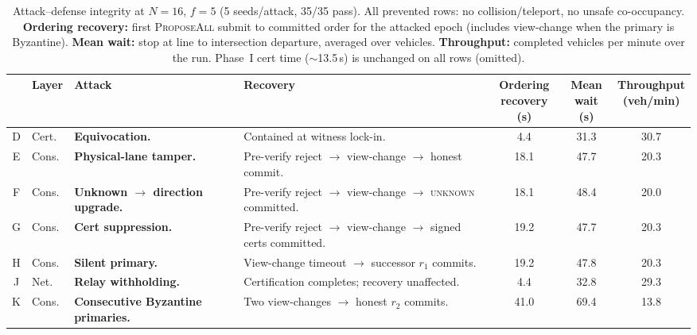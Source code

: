 \documentclass[letterpaper,10pt,conference]{IEEEtran}
\begin{document}
%
%
%
\begin{table}[t]
\centering
\caption{Attack--defense integrity at $N{=}16$, $f{=}5$ (5 seeds/attack, 35/35 pass).
  All prevented rows: no collision/teleport, no unsafe co-occupancy.
  \textbf{Ordering recovery:} first \textsc{ProposeAll} submit to committed order
  for the attacked epoch (includes view-change when the primary is Byzantine).
  \textbf{Mean wait:} stop at line to intersection departure, averaged over vehicles.
  \textbf{Throughput:} completed vehicles per minute over the run.
  Phase~I cert time ($\sim$13.5\,s) is unchanged on all rows (omitted).}
\label{tab:attack-defense}
\scriptsize
\setlength{\tabcolsep}{2.5pt}
\begin{tabularx}{\columnwidth}{@{}c l X X c c c@{}}
\toprule
 & Layer & Attack & Recovery &
  \shortstack{Ordering\\recovery (s)} &
  \shortstack{Mean\\wait (s)} &
  \shortstack{Throughput\\(veh/min)} \\
\midrule
D & Cert. &
  \textbf{Equivocation.} &
  Contained at witness lock-in. &
  4.4 & 31.3 & 30.7 \\
\addlinespace
E & Cons. &
  \textbf{Physical-lane tamper.} &
  Pre-verify reject $\to$ view-change $\to$ honest commit. &
  18.1 & 47.7 & 20.3 \\
\addlinespace
F & Cons. &
  \textbf{Unknown $\to$ direction upgrade.} &
  Pre-verify reject $\to$ view-change $\to$ \textsc{unknown} committed. &
  18.1 & 48.4 & 20.0 \\
\addlinespace
G & Cons. &
  \textbf{Cert suppression.} &
  Pre-verify reject $\to$ view-change $\to$ signed certs committed. &
  19.2 & 47.7 & 20.3 \\
\addlinespace
H & Cons. &
  \textbf{Silent primary.} &
  View-change timeout $\to$ successor $r_1$ commits. &
  19.2 & 47.8 & 20.3 \\
\addlinespace
J & Net. &
  \textbf{Relay withholding.} &
  Certification completes; recovery unaffected. &
  4.4 & 32.8 & 29.3 \\
\addlinespace
K & Cons. &
  \textbf{Consecutive Byzantine primaries.} &
  Two view-changes $\to$ honest $r_2$ commits. &
  41.0 & 69.4 & 13.8 \\
\bottomrule
\end{tabularx}
\end{table}
\end{document}
